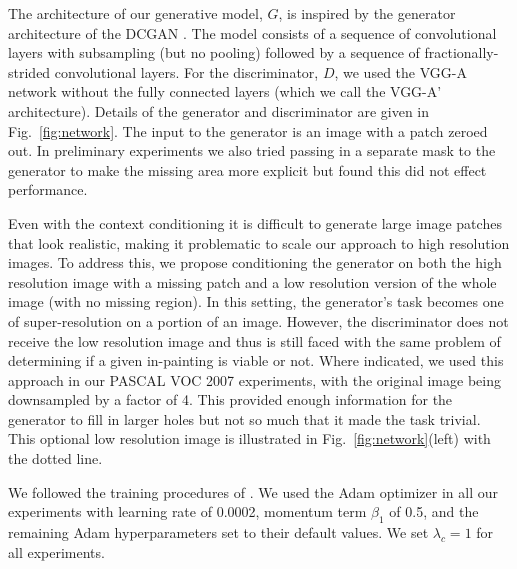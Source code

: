 \documentclass{article} %
\newcommand{\fig}[1]{Fig.~\ref{fig:#1}}
\begin{document}
The architecture of our generative model, $G$, is inspired by the
generator architecture of the DCGAN \citep{radford2016}.  The model
consists of a sequence of convolutional layers with subsampling (but
no pooling) followed by a sequence of fractionally-strided
convolutional layers.  For the discriminator, $D$, we used the VGG-A
network \citep{vgg} without the fully connected layers (which we call
the VGG-A' architecture). Details of the
generator and discriminator are given in \fig{network}. The input to the generator is an image with a patch zeroed out. In preliminary
experiments we also tried passing in a separate mask to the generator
to make the missing area more explicit but found this did not effect
performance.

Even with the context conditioning it is difficult to generate large
image patches that look realistic, making it problematic to scale our
approach to high resolution images.  To address this, we propose
conditioning the generator on both the high resolution image with a
missing patch and a low resolution version of the whole image (with no
missing region).  
In this setting, the generator’s task becomes one of super-resolution on a portion of an image. 
However, the discriminator does not receive the low resolution image and thus is still faced with the same problem of determining if a given in-painting is viable or not. 
Where indicated, we used this approach in our PASCAL VOC 2007
experiments, with the original image being downsampled by a
factor of 4.  This provided enough information for the generator to
fill in larger holes but not so much that it made the task trivial.
This optional low resolution image is illustrated in
\fig{network}(left) with the dotted line.

We followed the training procedures of \cite{radford2016}.
We used the Adam optimizer \citep{kingma2015} in all our experiments with learning rate of 0.0002, momentum term $\beta_1$ of 0.5, and the remaining Adam hyperparameters set to their default values.
We set $\lambda_c = 1$ for all experiments. 
\end{document}
